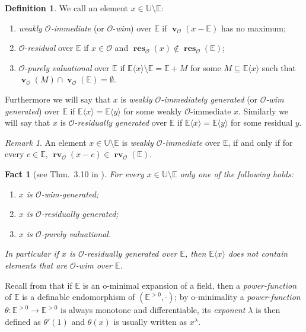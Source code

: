 \documentclass{amsart}
\newtheorem{fact}[theorem]{Fact}
\theoremstyle{remark}
\newtheorem{remark}[theorem]{Remark}
\theoremstyle{definition}
\newtheorem{definition}[theorem]{Definition}
\theoremstyle{plain}
\newcommand{\bE}{\mathbb E}
\newcommand{\bU}{\mathbb U}
\newcommand{\cO}{\mathcal O}
\DeclareMathOperator{\val}{\mathbf{v}}
\DeclareMathOperator{\rv}{\mathbf{rv}}
\DeclareMathOperator{\res}{\mathbf{res}}
\theoremstyle{plain}
\begin{document}
\begin{definition}
    We call an element $x\in \bU \setminus \bE$:
    \begin{enumerate}
        \item \emph{weakly $\cO$-immediate} (or $\cO$-\emph{wim}) over $\bE$ if $\val_{\cO}(x-\bE)$ has no maximum;
        \item $\cO$-\emph{residual} over $\bE$ if $x \in \cO$ and $\res_{\cO}(x)\notin \res_\cO(\bE)$;
        \item $\cO$-\emph{purely valuational} over $\bE$ if $\bE \langle x \rangle \setminus \bE = \bE + M$ for some $M\subseteq \bE \langle x \rangle$ such that $\val_{\cO}(M) \cap \val_{\cO}(\bE)=\emptyset$. 
    \end{enumerate}
    
    Furthermore we will say that $x$ is \emph{weakly $\cO$-immediately generated} (or \emph{$\cO$-wim generated}) over $\bE$ if $\bE\langle x \rangle = \bE \langle y \rangle$ for some weakly $\cO$-immediate $x$. Similarly we will say that $x$ is \emph{$\cO$-residually generated} over $\bE$ if $\bE\langle x \rangle = \bE \langle y \rangle$ for some residual $y$.
\end{definition}

\begin{remark}
	An element $x \in \bU\setminus \bE$ is \emph{weakly $\cO$-immediate} over $\bE$, if and only if for every $c \in \bE$, $\rv_{\cO}(x-c) \in \rv_{\cO} (\bE)$.
\end{remark}

\begin{fact}[see Thm.~3.10 in \cite{freni2024t}]\label{fact:cuts_tricho}
    For every $x \in \bU \setminus \bE$ only one of the following holds:
    \begin{enumerate}
        \item $x$ is $\cO$-wim-generated;
        \item $x$ is $\cO$-residually generated;
        \item $x$ is $\cO$-purely valuational.
    \end{enumerate}
    In particular if $x$ is $\cO$-residually generated over $\bE$, then $\bE\langle x \rangle$ does not contain elements that are $\cO$-wim over $\bE$.
\end{fact}

Recall from \cite[Sec.~1]{miller1993growth} that if $\bE$ is an o-minimal expansion of a field, then a \emph{power-function} of $\bE$ is a definable endomorphism of $(\bE^{>0}, \cdot)$; by o-minimality a \emph{power-function} $\theta: \bE^{>0} \to \bE^{>0}$ is always monotone and differentiable, its \emph{exponent} $\lambda$ is then defined as $\theta'(1)$ and $\theta(x)$ is usually written as $x^{\lambda}$.
\end{document}
